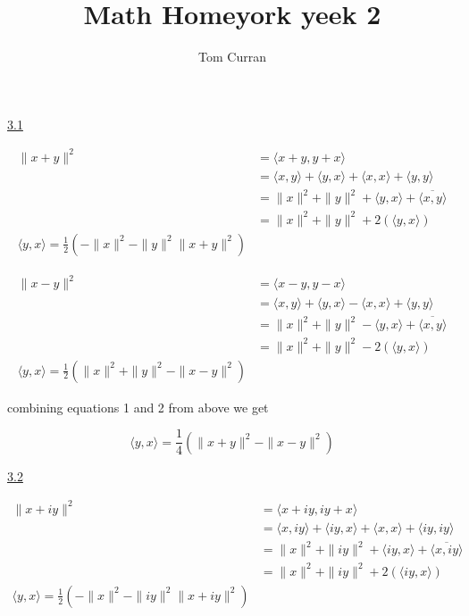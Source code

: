 \documentclass{article}
\title{Math Homeyork yeek 2}
\author{Tom Curran}
\begin{document}
\maketitle{}
\section{}

\underline{3.1}

\begin{equation} \label{eq1}
  \begin{split}
  \| x+ y \|^2 & = \langle x+ y, y+x\rangle \\
  & = \langle x,y \rangle + \langle y,x\rangle + \langle x,x\rangle + \langle y,y \rangle \\
  & = \| x\|^2 + \| y \|^2 + \langle y,x\rangle + \overline{\langle x,y \rangle} \\
  & = \| x\|^2 + \| y \|^2 + 2( \langle y,x\rangle )\\
  \langle y,x\rangle = \frac{1}{2}( - \| x\|^2 - \| y \|^2  \| x + y \|^2)
 \end{split}
\end{equation}\label{eq1}

\begin{equation} \label{eq2}
  \begin{split}
  \| x - y \|^2 & = \langle x - y, y - x\rangle \\
  & = \langle x,y \rangle + \langle y,x\rangle - \langle x,x\rangle + \langle y,y \rangle \\
  & = \| x\|^2 + \| y \|^2 -\langle y,x\rangle + \overline{\langle x,y \rangle} \\
  & = \| x\|^2 + \| y \|^2 - 2( \langle y,x\rangle ) \\
  \langle y,x\rangle = \frac{1}{2}(\| x\|^2 + \| y \|^2 - \| x-y \|^2)
 \end{split}
\end{equation}\label{eq2}

combining equations 1 and 2 from above we get

\[ \langle y,x\rangle =  \frac{1}{4} (\| x+ y \|^2 - \| x - y \|^2) \]

\underline{3.2}

\begin{equation} \label{eq3}
  \begin{split}
  \| x + i y \|^2 & = \langle x+ iy, iy+x\rangle \\
  & = \langle x,iy \rangle + \langle iy,x\rangle + \langle x,x\rangle + \langle iy,iy \rangle \\
  & = \| x\|^2 + \| iy \|^2 + \langle iy,x\rangle + \overline{\langle x,iy \rangle} \\
  & = \| x\|^2 + \| iy \|^2 + 2( \langle iy,x\rangle )\\
  \langle y,x\rangle = \frac{1}{2}( - \| x\|^2 - \| iy \|^2  \| x + i y \|^2)
 \end{split}
\end{equation}\label{eq3}
\end{document}
